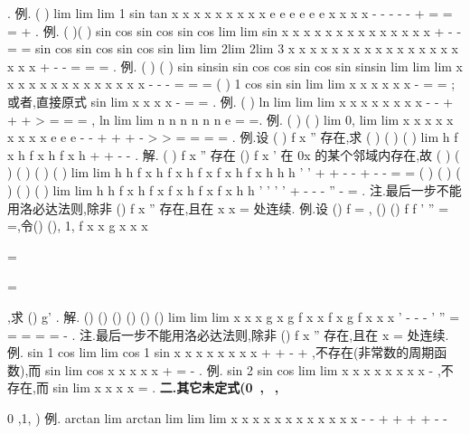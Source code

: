 . 
\textcolor{lyred}{例}.
(
)
lim
lim
lim
1 sin
tan
x
x
x
x
x
x
x
x
x
e
e
e
e
e
e
x
x
x
x
-
-
-
\to 
\to 
\to 
-
-
+
=
=
=\infty 
+
. 
\textcolor{lyred}{例}.
(
)(
)
sin
cos
sin
cos
sin
cos
lim
lim
sin
x
x
x
x
x
x
x
x
x
x
x
x
x
x
\to 
\to 
+
-
-
=
= 
sin
cos
sin
cos
sin
cos
sin
lim
lim
2lim
2lim 3
x
x
x
x
x
x
x
x
x
x
x
x
x
x
x
x
x
x
x
\to 
\to 
\to 
\to 
+
-
-
\cdots 
=
=
=
. 
\textcolor{lyred}{例}.
(
)
(
)
sin
sinsin
sin
cos
cos sin
cos
sin
sinsin
lim
lim
lim
x
x
x
x
x
x
x
x
x
x
x
x
x
x
\to 
\to 
\to 
-
-
\cdots 
-
=
=
= 
(
)
1 cos sin
sin
lim
lim
x
x
x
x
x
x
\to 
\to 
-
=
=
;或者,直接原式
sin
lim
x
x
x
x
\to 
-
=
=
. 
\textcolor{lyred}{例}.
(
)
ln
lim
lim
lim
x
x
x
x
x
x
x
x
\alpha 
\alpha 
\alpha 
\alpha 
\alpha 
\alpha 
-
-
\to +\infty 
\to +\infty 
\to +\infty 
>
=
=
=
,
ln
lim
lim
n
n
n
n
n
n
e
\to \infty 
\to \infty 
=
=. 
\textcolor{lyred}{例}.
(
)
(
)
lim
0,
lim
lim
x
x
x
x
x
x
x
x
x
e
e
e
\alpha 
\alpha 
\alpha 
\lambda 
\lambda 
\lambda 
\alpha \alpha 
\alpha 
\alpha 
\lambda 
\lambda 
\lambda 
-
-
\to +\infty 
\to +\infty 
\to +\infty 
-
>
>
=
=
=
=
\Lambda 
. 
\textcolor{lyred}{例}.设
(
)
f
x
''
存在,求
(
)
(
)
(
)
lim
h
f x
h
f x
h
f x
h
\to 
+
+
-
-
. 
解.
(
)
f
x
''
存在
()
f
x
'
\Rightarrow 
在
0x 的某个邻域内存在,故 
(
)
(
)
(
)
(
)
(
)
lim
lim
h
h
f x
h
f x
h
f x
f
x
h
f
x
h
h
h
\to 
\to 
'
'
+
+
-
-
+
-
-
=
= 
(
)
(
)
(
)
(
)
(
)
lim
lim
h
h
f
x
h
f
x
f
x
h
f
x
f
x
h
h
\to 
\to 
'
'
'
'
+
-
-
-
''
-
=
. 
\textcolor{lyred}{注}.最后一步不能用洛必达法则,除非
()
f
x
''
存在,且在
x
x
=
处连续. 
\textcolor{lyred}{例}.设
()
f
=
,
()
()
f
f
'
''
=
=,令()
(),
1,
f x
x
g x
x
x

\neq 

=

=

,求
()
g'
. 
解.
()
()
()
()
()
()
lim
lim
lim
x
x
x
g x
g
f x
x
f
x
g
f
x
x
x
\to 
\to 
\to 
'
-
-
-
'
''
=
=
=
=
=
-
. 
\textcolor{lyred}{注}.最后一步不能用洛必达法则,除非
()
f
x
''
存在,且在
x =
处连续. 
\textcolor{lyred}{例}.
sin
1 cos
lim
lim
cos
1 sin
x
x
x
x
x
x
x
x
\to \infty 
\to \infty 
+
+
\Rightarrow 
-
+
,不存在(非常数的周期函数),而
sin
lim
cos
x
x
x
x
x
\to \infty 
+
=
-
. 
\textcolor{lyred}{例}.
sin
2 sin
cos
lim
lim
x
x
x
x
x
x
x
x
\to 
\to 
-
\Rightarrow 
,不存在,而
sin
lim
x
x
x
x
\to 
=
. 
\vspace{4pt}
{\bfseries \textcolor{lyred}{二.其它未定式(0,,}}

\textcolor{lyred}{0}\textcolor{lyred}{ }\textcolor{lyred}{,}\textcolor{lyred}{1}\textcolor{lyred}{\infty }\textcolor{lyred}{,}
\textcolor{lyred}{\infty }\textcolor{lyred}{) }
\textcolor{lyred}{例}.
arctan
lim
arctan
lim
lim
lim
x
x
x
x
x
x
x
x
x
x
x
x
\pi 
\pi 
-
-
\to +\infty 
\to +\infty 
\to +\infty 
\to +\infty 
-
-



